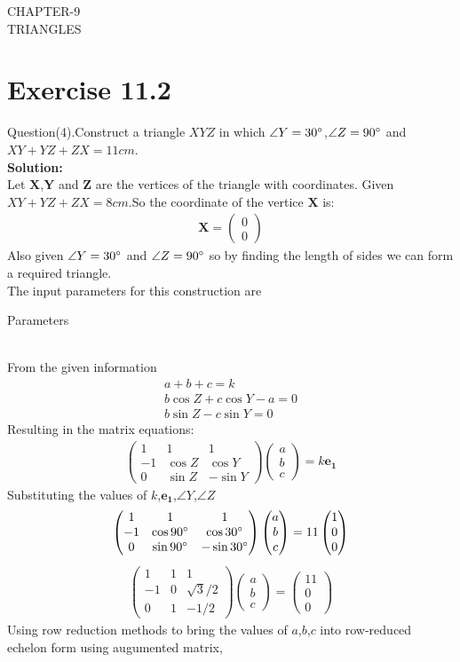 \documentclass[10pt]{article}
\newcommand{\myvec}[1]{\ensuremath{\begin{pmatrix}#1\end{pmatrix}}}
\let\vec\mathbf{}
\begin{document}
\begin{center}
        \textbf\large{CHAPTER-9 \\ TRIANGLES}
\end{center}
\section{Exercise 11.2}
Question(4).Construct a triangle $XYZ$ in which $\angle{Y}=30\degree$,$\angle{Z}=90\degree$ and $XY+YZ+ZX=11cm$. \\
\textbf{Solution:}\\
Let $\vec{X}$,$\vec{Y}$ and $\vec{Z}$ are the vertices of the triangle with coordinates.
Given $XY+YZ+ZX=8cm$.So the coordinate of the vertice  $\vec{X}$ is:
\begin{align}
{
\vec{X} =\myvec{0\\0}
}
\end{align}
Also given $\angle{Y}=30\degree$ and $\angle{Z}=90\degree$ so by finding the length of sides we can form a required triangle. \\
 The input parameters for this construction are\\
 \begin{table}[h]
	 \centering
	 
	 \caption{Parameters}
	 \label{tab:table1}
 \end{table}\\
From the given information\\
 \begin{align}
     a+b+c=k\\
	 b\cos{Z}+c\cos{Y}-a=0\\
	 b\sin{Z}-c\sin{Y}=0
 \end{align}
 Resulting in the matrix equations:
 \begin{align}
	 \myvec{1 & 1 & 1\\-1 & \cos{Z} & \cos{Y}\\0 & \sin{Z} & -\sin{Y}}\myvec{a \\ b \\ c}=k\vec{e_1}
 \end{align}
 Substituting the values of $k$,$\vec{e_1}$,$\angle{Y}$,$\angle{Z}$
 \begin{align}
     \myvec{1 & 1 & 1\\-1 & \cos{90\degree} & \cos{30\degree}\\ 0 & \sin{90\degree} & -\sin{30\degree}}\myvec{a \\ b \\ c}= 11\myvec{1 \\ 0 \\ 0 }
 \end{align}
  \begin{align}
	  \myvec{1 & 1 & 1\\-1 & 0 & \sqrt{3}/2\\0 &  1 & -1/2}\myvec{a \\ b \\c}= \myvec{11 \\ 0 \\ 0 }
  \end{align}
 Using row reduction methods to bring the values of $a$,$b$,$c$ into row-reduced echelon form using augumented matrix,
\end{document}
